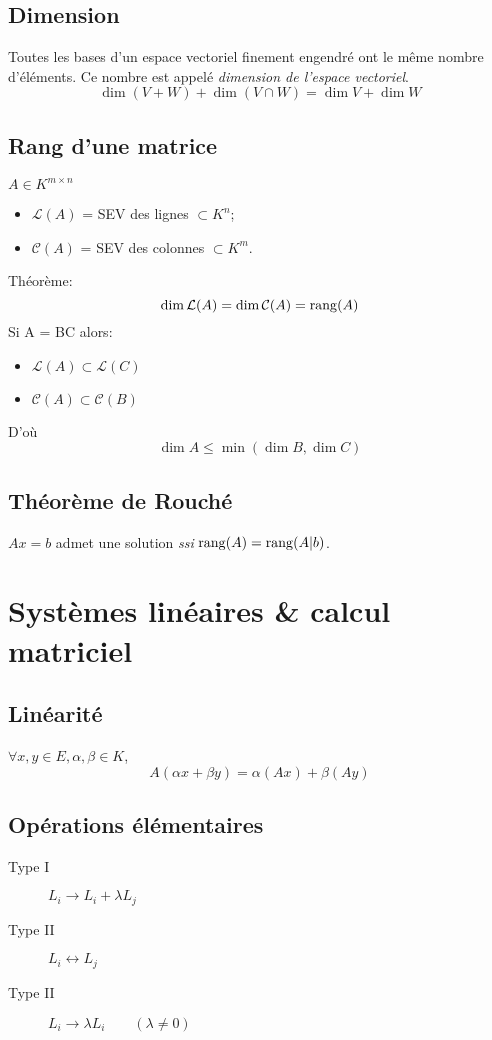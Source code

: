 \subsection{Dimension}
Toutes les bases d'un espace vectoriel finement engendré ont le même nombre
d'éléments. Ce nombre est appelé \emph{dimension de l'espace vectoriel}.
\[ \dim(V + W)  + \dim(V \cap W) = \dim V + \dim W \]

\subsection{Rang d'une matrice}
$A \in K^{m\times{n}}$\\
\begin{itemize}
  \item $\mathcal{L}(A)$ = SEV des lignes $\subset K^n$;
  \item $\mathcal{C}(A)$ = SEV des colonnes $\subset K^m$.
\end{itemize}
Théorème:
\[ \dim\mathcal{L}(A) = \dim\mathcal{C}(A) = \operatorname{rang}(A) \]
Si A = BC alors:
\begin{itemize}
  \item $\mathcal{L}(A) \subset \mathcal{L}(C)$
  \item $\mathcal{C}(A) \subset \mathcal{C}(B)$
\end{itemize}
D'où
\[ \dim A \leq \min(\dim B, \dim C) \]

\subsection{Théorème de Rouché}
$Ax = b$ admet une solution \emph{ssi} $\operatorname{rang}(A) = \operatorname{rang}(A | b)$.

\section{Systèmes linéaires \& calcul matriciel}

\subsection{Linéarité}
$\forall x,y \in{E}, \alpha, \beta \in{K}$,
\[ A(\alpha{x} + \beta{y}) = \alpha{(Ax)} + \beta{(Ay)} \]

\subsection{Opérations élémentaires}
\begin{description}
  \item[Type I] $L_i \rightarrow L_i + \lambda{L_j}$
  \item[Type II] $L_i \leftrightarrow L_j$
  \item[Type II] $L_i \rightarrow \lambda{L_i} \qquad{(\lambda \neq 0)}$
\end{description}
